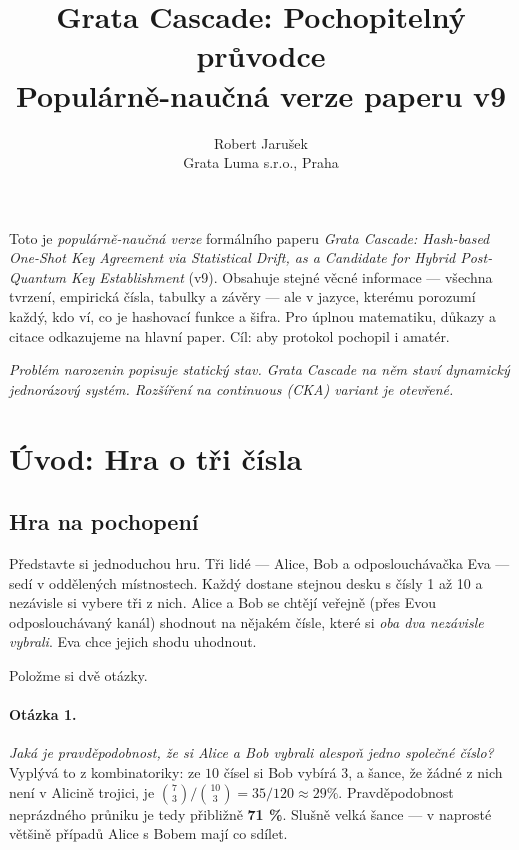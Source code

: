 \documentclass[11pt,a4paper]{article}
\title{Grata Cascade: Pochopitelný průvodce\\
\large Populárně-naučná verze paperu v9}
\author{Robert Jarušek\\Grata Luma s.r.o., Praha}
\date{}
\begin{document}
\maketitle

\begin{tldr}
Toto je \emph{populárně-naučná verze} formálního paperu \emph{Grata Cascade: Hash-based One-Shot Key Agreement via Statistical Drift, as a Candidate for Hybrid Post-Quantum Key Establishment} (v9). Obsahuje stejné věcné informace --- všechna tvrzení, empirická čísla, tabulky a závěry --- ale v jazyce, kterému porozumí každý, kdo ví, co je hashovací funkce a šifra. Pro úplnou matematiku, důkazy a citace odkazujeme na hlavní paper. Cíl: aby protokol pochopil i amatér.
\end{tldr}

\medskip
\noindent\emph{Problém narozenin popisuje statický stav. Grata Cascade na něm staví dynamický jednorázový systém. Rozšíření na continuous (CKA) variant je otevřené.}

\tableofcontents
\bigskip

\section{Úvod: Hra o tři čísla}\label{pop:intro}

\subsection{Hra na pochopení}

Představte si jednoduchou hru. Tři lidé --- Alice, Bob a odposlouchávačka Eva --- sedí v oddělených místnostech. Každý dostane stejnou desku s čísly 1 až 10 a nezávisle si vybere tři z nich. Alice a Bob se chtějí veřejně (přes Evou odposlouchávaný kanál) shodnout na nějakém čísle, které si \emph{oba dva nezávisle vybrali}. Eva chce jejich shodu uhodnout.

Položme si dvě otázky.

\paragraph{Otázka 1.} \emph{Jaká je pravděpodobnost, že si Alice a Bob vybrali alespoň jedno společné číslo?} Vyplývá to z kombinatoriky: ze $10$ čísel si Bob vybírá $3$, a šance, že žádné z nich není v Alicině trojici, je $\binom{7}{3}/\binom{10}{3} = 35/120 \approx 29\%$. Pravděpodobnost neprázdného průniku je tedy přibližně \textbf{71 \%}. Slušně velká šance --- v naprosté většině případů Alice s Bobem mají co sdílet.
\end{document}
